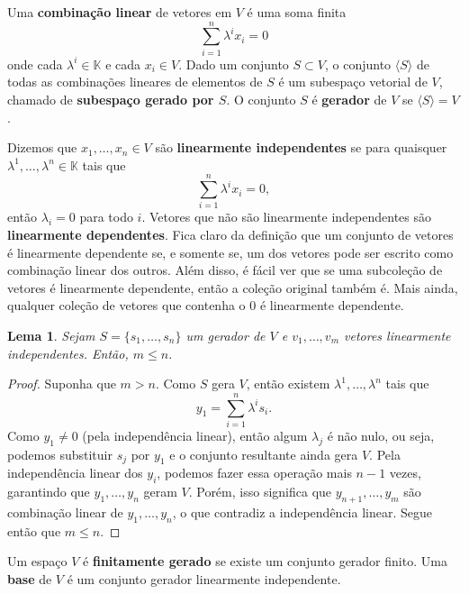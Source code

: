 \documentclass{article}
\newtheorem{lemma}[definition]{Lema}
\begin{document}
Uma \textbf{combinação linear} de vetores em $V$ é uma soma finita \begin{equation}
    \sum_{i = 1}^n \lambda^i x_i = 0
\end{equation} onde cada $\lambda^i \in \mathbb{K}$ e cada $x_i \in V$. Dado um conjunto $S \subset V$, o conjunto $\langle S \rangle$ de todas as combinações lineares de elementos de $S$ é um subespaço vetorial de $V$, chamado de \textbf{subespaço gerado por $S$}. O conjunto $S$ é \textbf{gerador} de $V$ se $\langle S \rangle = V$.

Dizemos que $x_1, \dots, x_n \in V$ são \textbf{linearmente independentes} se para quaisquer $\lambda^1, \dots, \lambda^n \in \mathbb{K}$ tais que \begin{equation}
    \sum_{i = 1}^n \lambda^i x_i = 0,
\end{equation} então $\lambda_i = 0$ para todo $i$. Vetores que não são linearmente independentes são \textbf{linearmente dependentes}. Fica claro da definição que um conjunto de vetores é linearmente dependente se, e somente se, um dos vetores pode ser escrito como combinação linear dos outros. Além disso, é fácil ver que se uma subcoleção de vetores é linearmente dependente, então a coleção original também é. Mais ainda, qualquer coleção de vetores que contenha o $0$ é linearmente dependente.

\begin{lemma}\label{lemma1}
    Sejam $S = \{s_1, \dots, s_n\}$ um gerador de $V$ e $v_1, \dots, v_m$ vetores linearmente independentes. Então, $m \leq n$.
\end{lemma}
\begin{proof}
    Suponha que $m > n$. Como $S$ gera $V$, então existem $\lambda^1, \dots, \lambda^n$ tais que \begin{equation}
        y_1 = \sum_{i = 1}^n \lambda^i s_i.
    \end{equation} Como $y_1 \neq 0$ (pela independência linear), então algum $\lambda_j$ é não nulo, ou seja, podemos substituir $s_j$ por $y_1$ e o conjunto resultante ainda gera $V$. Pela independência linear dos $y_i$, podemos fazer essa operação mais $n-1$ vezes, garantindo que $y_1, \dots, y_n$ geram $V$. Porém, isso significa que $y_{n+1}, \dots, y_m$ são combinação linear de $y_1, \dots, y_n$, o que contradiz a independência linear. Segue então que $m \leq n$.
\end{proof}

Um espaço $V$ é \textbf{finitamente gerado} se existe um conjunto gerador finito. Uma \textbf{base} de $V$ é um conjunto gerador linearmente independente.
\end{document}
